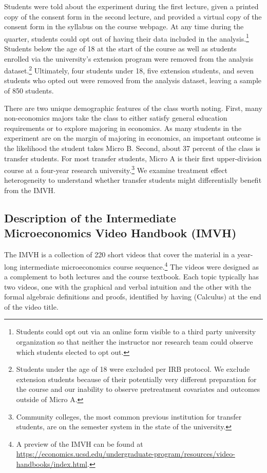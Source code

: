 Students were told about the experiment during the first lecture, given a printed copy of the consent form in the second lecture, and provided a virtual copy of the consent form in the syllabus on the course webpage.
At any time during the quarter, students could opt out of having their data included in the analysis.\footnote{Students could opt out via an online form visible to a third party university organization so that neither the instructor nor research team could observe which students elected to opt out.}
Students below the age of 18 at the start of the course as well as students enrolled via the university's extension program were removed from the analysis dataset.\footnote{Students under the age of 18 were excluded per IRB protocol.
	We exclude extension students because of their potentially very different preparation for the course and our inability to observe pretreatment covariates and outcomes outside of Micro A.
}
Ultimately, four students under 18, five extension students, and seven students who opted out were removed from the analysis dataset, leaving a sample of 850 students.

There are two unique demographic features of the class worth noting.
First, many non-economics majors take the class to either satisfy general education requirements or to explore majoring in economics.
As many students in the experiment are on the margin of majoring in economics, an important outcome is the likelihood the student takes Micro B.
Second, about 37 percent of the class is transfer students.
For most transfer students, Micro A is their first upper-division course at a four-year research university.\footnote{Community colleges, the most common previous institution for transfer students, are on the semester system in the state of the university.}
We examine treatment effect heterogeneity to understand whether transfer students might differentially benefit from the IMVH.

\subsection{Description of the Intermediate Microeconomics Video Handbook (IMVH)}\label{subsec:handbook_description}

The IMVH is a collection of 220 short videos that cover the material in a year-long intermediate microeconomics course sequence.\footnote{A preview of the IMVH can be found at \url{https://economics.ucsd.edu/undergraduate-program/resources/video-handbooks/index.html}.}
The videos were designed as a complement to both lectures and the course textbook.
Each topic typically has two videos, one with the graphical and verbal intuition and the other with the formal algebraic definitions and proofs, identified by having (Calculus) at the end of the video title.

